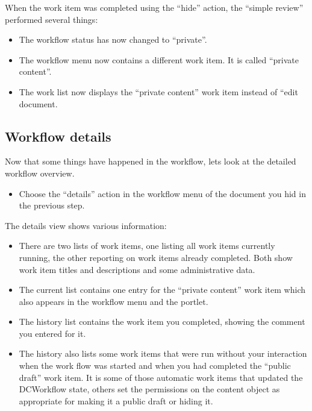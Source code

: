 When the work item was completed using the ``hide'' action, the ``simple review'' performed several things:
\begin{itemize}
    \item The workflow status has now changed to ``private''.
    \item The workflow menu now contains a different work item. It is called ``private content''. 
    \item The work list now displays the ``private content'' work item instead of ``edit document.
\end{itemize}

\subsection{Workflow details}
\label{sec:tut-details}

Now that some things have happened in the workflow, lets look at
the detailed workflow overview.

\begin{itemize}
\item Choose the ``details'' action in the workflow menu of the document you hid
  in the previous step.
\end{itemize}

The details view shows various information:

\begin{itemize}
\item There are two lists of work items, one listing all work items currently
  running, the other reporting on work items already completed. Both show work
  item titles and descriptions and some administrative data.
\item The current list contains one entry for the ``private content'' work
  item which also appears in the workflow menu and the portlet.
\item The history list contains the work item you completed, showing the
  comment you entered for it.
\item The history also lists some work items that were
  run without your interaction when the work flow was started and when you had
  completed the ``public draft'' work item. It is some of those automatic work
  items that updated the DCWorkflow state, others set the permissions on the
  content object as appropriate for making it a public draft or hiding it.
\end{itemize}

